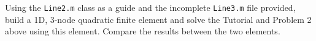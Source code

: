 Using the \texttt{Line2.m} class as a guide and the incomplete \texttt{Line3.m} file provided, build a 1D, 3-node quadratic finite element and solve the Tutorial and Problem 2 above using this element. Compare the results between the two elements.